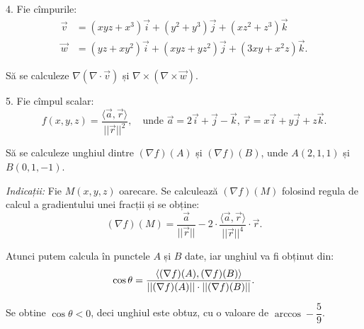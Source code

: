 \vspace{1cm}

4. Fie cîmpurile:
\begin{align*}
  \vec{v} &= (xyz + x^3) \vec{i} + (y^2 + y^3) \vec{j} + (xz^2 + z^3) \vec{k} \\
  \vec{w} &= (yz + xy^2) \vec{i} + (xyz + yz^2) \vec{j} + (3xy + x^2 z) \vec{k}.
\end{align*}

Să se calculeze $ \nabla(\nabla \cdot \vec{v}) $ și $ \nabla \times (\nabla \times \vec{w}) $.

\vspace{1cm}

5. Fie cîmpul scalar:
\[
  f(x, y, z) = \dfrac{\langle \vec{a}, \vec{r} \rangle}{||\vec{r}||^2}, \quad \text{unde } %
  \vec{a} = 2 \vec{i} + \vec{j} - \vec{k}, \ \vec{r} = x\vec{i} + y\vec{j} + z \vec{k}.
\]

Să se calculeze unghiul dintre $ (\nabla f)(A) $ și $ (\nabla f)(B) $, unde
$ A(2, 1, 1) $ și $ B(0, 1, -1) $.

\emph{Indicații:} Fie $ M(x, y, z) $ oarecare. Se calculează $ (\nabla f)(M) $ folosind
regula de calcul a gradientului unei fracții și se obține:
\[
  (\nabla f)(M) = \dfrac{\vec{a}}{||\vec{r}||} - 2 \cdot \dfrac{\langle \vec{a}, \vec{r} \rangle}{||\vec{r}||^4} %
  \cdot \vec{r}.
\]

Atunci putem calcula în punctele $ A $ și $ B $ date, iar unghiul va fi obținut din:
\[
  \cos \theta = \dfrac{\langle (\nabla f)(A), (\nabla f)(B) \rangle}{%
    ||(\nabla f)(A)|| \cdot || (\nabla f)(B) ||}.
\]

Se obtine $ \cos \theta < 0 $, deci unghiul este obtuz, cu o valoare de $ \arccos -\dfrac{5}{9} $.


